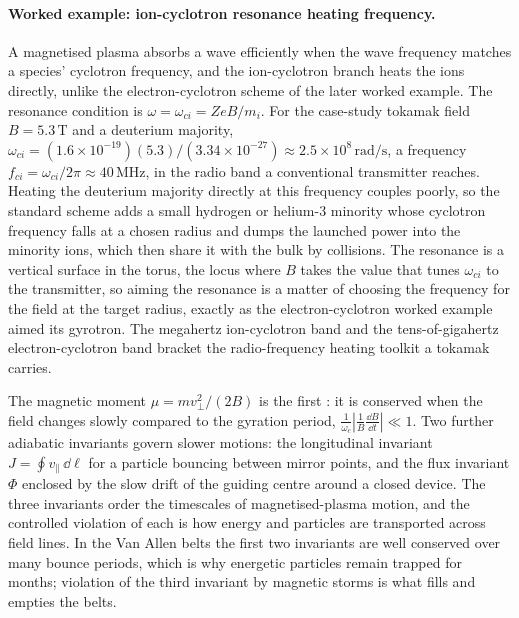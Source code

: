 \paragraph{Worked example: ion-cyclotron resonance heating frequency.}
A magnetised plasma absorbs a wave efficiently when the wave frequency matches a
species' cyclotron frequency, and the ion-cyclotron branch heats the ions
directly, unlike the electron-cyclotron scheme of the later worked example. The
resonance condition is $\omega = \omega_{ci} = ZeB/m_i$. For the case-study
tokamak field $B = 5.3\,\si{\tesla}$ and a deuterium majority, $\omega_{ci} =
(1.6\times 10^{-19})(5.3)/(3.34\times 10^{-27}) \approx 2.5\times 10^{8}\,\si{
\radian\per\second}$, a frequency $f_{ci} = \omega_{ci}/2\pi \approx 40\,\si{
\mega\hertz}$, in the radio band a conventional transmitter reaches. Heating the
deuterium majority directly at this frequency couples poorly, so the standard
scheme adds a small hydrogen or helium-3 minority whose cyclotron frequency
falls at a chosen radius and dumps the launched power into the minority ions,
which then share it with the bulk by collisions. The resonance is a vertical
surface in the torus, the locus where $B$ takes the value that tunes $\omega_{ci}$
to the transmitter, so aiming the resonance is a matter of choosing the
frequency for the field at the target radius, exactly as the electron-cyclotron
worked example aimed its gyrotron. The megahertz ion-cyclotron band and the
tens-of-gigahertz electron-cyclotron band bracket the radio-frequency heating
toolkit a tokamak carries.

\begin{mastery}
The magnetic moment $\mu = mv_{\perp}^{2}/(2B)$ is the first
: it is conserved when the field changes
slowly compared to the gyration period, $\frac{1}{\omega_{c}}\left|
\frac{1}{B}\frac{\dd B}{\dd t}\right| \ll 1$. Two further adiabatic
invariants govern slower motions: the longitudinal invariant $J = \oint
v_{\parallel}\,\dd\ell$ for a particle bouncing between mirror points, and
the flux invariant $\Phi$ enclosed by the slow drift of the guiding centre
around a closed device. The three invariants order the timescales of
magnetised-plasma motion, and the controlled violation of each is how
energy and particles are transported across field lines. In the Van Allen
belts the first two invariants are well conserved over many bounce
periods, which is why energetic particles remain trapped for months;
violation of the third invariant by magnetic storms is what fills and
empties the belts.
\end{mastery}

